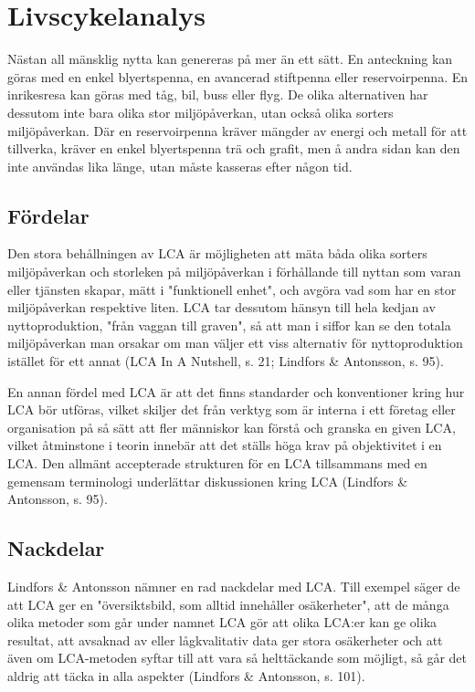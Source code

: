 \documentclass{article}
\begin{document}

\clearpage
\section{Livscykelanalys}

Nästan all mänsklig nytta kan genereras på mer än ett sätt. En anteckning kan göras med en enkel blyertspenna, en avancerad stiftpenna eller reservoirpenna. En inrikesresa kan göras med tåg, bil, buss eller flyg. De olika alternativen har dessutom inte bara olika stor miljöpåverkan, utan också olika sorters miljöpåverkan. Där en reservoirpenna kräver mängder av energi och metall för att tillverka, kräver en enkel blyertspenna trä och grafit, men å andra sidan kan den inte användas lika länge, utan måste kasseras efter någon tid. 

\subsection{Fördelar}

Den stora behållningen av LCA är möjligheten att mäta båda olika sorters miljöpåverkan och storleken på miljöpåverkan i förhållande till nyttan som varan eller tjänsten skapar, mätt i "funktionell enhet", och avgöra vad som har en stor miljöpåverkan respektive liten. LCA tar dessutom hänsyn till hela kedjan av nyttoproduktion, "från vaggan till graven", så att man i siffor kan se den totala miljöpåverkan man orsakar om man väljer ett viss alternativ för nyttoproduktion istället för ett annat (LCA In A Nutshell, s. 21; Lindfors \& Antonsson, s. 95).

En annan fördel med LCA är att det finns standarder och konventioner kring hur LCA bör utföras, vilket skiljer det från verktyg som är interna i ett företag eller organisation på så sätt att fler människor kan förstå och granska en given LCA, vilket åtminstone i teorin innebär att det ställs höga krav på objektivitet i en LCA. Den allmänt accepterade strukturen för en LCA tillsammans med en gemensam terminologi underlättar diskussionen kring LCA (Lindfors \& Antonsson, s. 95).

\subsection{Nackdelar}

Lindfors \& Antonsson nämner en rad nackdelar med LCA. Till exempel säger de att LCA ger en "översikts\-bild, som alltid innehåller osäkerheter", att de många olika metoder som går under namnet LCA gör att olika LCA:er kan ge olika resultat, att avsaknad av eller lågkvalitativ data ger stora osäkerheter och att även om LCA-metoden syftar till att vara så helttäckande som möjligt, så går det aldrig att täcka in alla aspekter (Lindfors \& Antonsson, s. 101).
\end{document}
